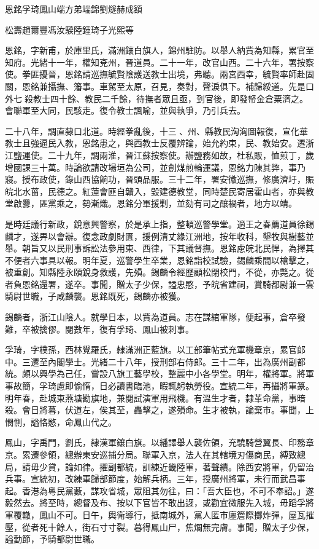 
\begin{pinyinscope}
恩銘孚琦鳳山端方弟端錦劉燧赫成額

松壽趙爾豐馮汝騤陸鍾琦子光熙等

恩銘，字新甫，於庫里氏，滿洲鑲白旗人，錦州駐防。以舉人納貲為知縣，累官至知府。光緒十一年，權知兗州，晉道員。二十一年，改官山西。二十六年，署按察使。拳匪擾晉，恩銘請巡撫毓賢陰護送教士出境，弗聽。兩宮西幸，毓賢率師赴固關，恩銘兼攝撫、籓事。車駕至太原，召見，奏對，聲淚俱下。補歸綏道。先是口外七殺教士四十餘、教民二千餘，待撫者眾且亟，到官後，即發帑金倉粟濟之。會聯軍至大同，民駭走。復令教士諷喻，並與執爭，乃引兵去。

二十八年，調直隸口北道。時經拳亂後，十三、州、縣教民洶洶圖報復，宣化華教士且強逼民入教，恩銘患之，與西教士反覆辨論，始允約束，民、教始安。遷浙江鹽運使。二十九年，調兩淮，晉江蘇按察使。辦鹽務如故，杜私販，恤煎丁，歲增國課三十萬。時論欲請改場垣為公司，並創煤煎輪運議，恩銘力陳其弊，事乃寢。授布政使，錄山西協餉功，晉頭品服。三十二年，署安徽巡撫，修廣濟圩，賑皖北水菑，民德之。紅蓮會匪自贛入，毀建德教堂，同時楚民寄居霍山者，亦與教堂啟釁，匪黨乘之，勢漸熾。恩銘分軍援剿，並劾有司之釀禍者，地方以靖。

是時廷議行新政，銳意興警察，於是承上指，整頓巡警學堂。適王之春薦道員徐錫麟才，遂畀以會辦。復念政劇財匱，援例清丈緣江洲地，按年收科，墾牧與樹藝並舉。朝旨又以民刑事訴訟法參用東、西律，下其議督撫。恩銘慮皖北民悍，為擇其不便者六事具以報。明年夏，巡警學生卒業，恩銘詣校試驗，錫麟乘間以槍擊之，被重創。知縣陸永頤銳身救護，先殞。錫麟令經歷顧松閉校門，不從，亦斃之。從者負恩銘還署，遂卒。事聞，贈太子少保，謚忠愍，予皖省建祠，賞騎都尉兼一雲騎尉世職，子咸麟襲。恩銘既死，錫麟亦被獲。

錫麟者，浙江山陰人。就學日本，以貲為道員。志在謀綰軍隊，便起事，倉卒發難，卒被擒僇。閱數年，復有孚琦、鳳山被刺事。

孚琦，字樸孫，西林覺羅氏，隸滿洲正藍旗。以工部筆帖式充軍機章京，累官郎中。三遷至內閣學士。光緒二十八年，授刑部右侍郎。三十二年，出為廣州副都統。頗以興學為己任，嘗設八旗工藝學校，整麗中小各學堂。明年，權將軍。將軍事故簡，孚琦慮即偷惰，日必讀書臨池，暇輒躬執勞役。宣統二年，再攝將軍篆。明年春，赴城東燕塘勘旗地，兼閱試演軍用飛機。有溫生才者，隸革命黨，事暗殺。會日將暮，伏道左，俟其至，轟擊之，遂殞命。生才被執，論棄市。事聞，上憫惻，謚恪愍，命鳳山代之。

鳳山，字禹門，劉氏，隸漢軍鑲白旗。以繙譯舉人襲佐領，充驍騎營翼長、印務章京。累遷參領，總辦東安巡捕分局。聯軍入京，法人在其轄境刃傷商民，縛致總局，請毋少貸，論如律。擢副都統，訓練近畿陸軍，著聲績。除西安將軍，仍留治兵事。宣統初，改練軍歸部節度，始解兵柄。三年，授廣州將軍，未行而武昌事起。香港為粵民黨藪，謀攻省城，眾阻其勿往，曰：「吾大臣也，不可不奉詔。」遂毅然去。將至時，總督及布、按以下官皆不敢出迓，或勸宜微服先入城，毋蹈孚將軍覆轍，鳳山不可。日午，輿衛導行，抵南城外，黨人匿市廛簷際擲炸彈，屋瓦摧壓，從者死十餘人，街石寸寸裂。暮得鳳山尸，焦爛無完膚。事聞，贈太子少保，謚勤節，予騎都尉世職。


\end{pinyinscope}
